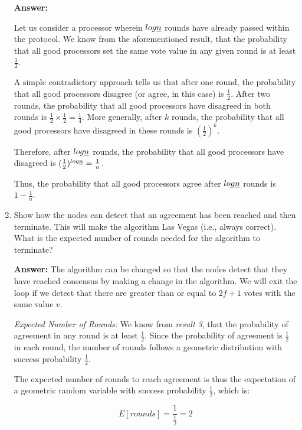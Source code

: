 \documentclass[11pt]{article}
\begin{document}
\begin{enumerate}
    \textbf{Answer:}

    Let us consider a processor wherein \(log\emph{n}\) rounds have already passed within the protocol. We know from the aforementioned result, that the probability that all good processors set the same vote value in any given round is at least \(\frac{1}{2}\).

    A simple contradictory approach tells us that after one round, the probability that all good processors disagree (or agree, in this case) is \(\frac{1}{2}\). After two rounds, the probability that all good processors have disagreed in both rounds is \(\frac{1}{2} \times \frac{1}{2} = \frac{1}{4}\). More generally, after \(k\) rounds, the probability that all good processors have disagreed in these rounds is \((\frac{1}{2})^{k}\).

    Therefore, after \(log\emph{n}\) rounds, the probability that all good processors have disagreed is \((\frac{1}{2})^{log\emph{n}} = \frac{1}{n}\).

    Thus, the probability that all good processors agree after \(log\emph{n}\) rounds is \(1 - \frac{1}{n}\). %
    
    \item Show how the nodes can detect that an agreement has been reached and then terminate. This will make the algorithm Las Vegas (i.e., always correct). What is the expected number of rounds needed for the algorithm to terminate?

    \textbf{Answer:}
    The algorithm can be changed so that the nodes detect that they have reached consensus by making a change in the algorithm. We will exit the loop if we detect that there are greater than or equal to $2f + 1$ votes with the same value $v$.

    \emph{Expected Number of Rounds:}
    We know from \textit{result 3}, that the probability of agreement in any round is at least \(\frac{1}{2}\). Since the probability of agreement is \(\frac{1}{2}\) in each round, the number of rounds follows a geometric distribution with success probability \(\frac{1}{2}\).

    The expected number of rounds to reach agreement is thus the expectation of a geometric random variable with success probability \(\frac{1}{2}\), which is:

    \[
        E[rounds] = \frac{1}{\frac{1}{2}} = 2
    \]
    
\end{enumerate}
\end{document}
